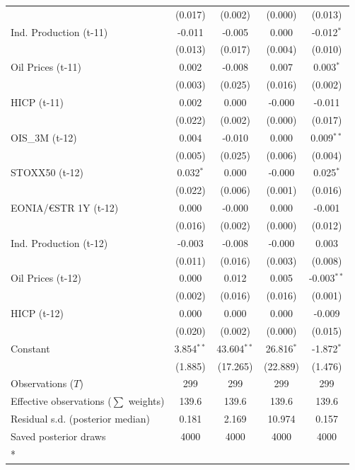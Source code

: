 \begin{longtable}[t]{lcccc}
 & (0.017) & (0.002) & (0.000) & (0.013)\\
Ind. Production (t-11) & -0.011 & -0.005 & 0.000 & -0.012$^{*}$\\
 & (0.013) & (0.017) & (0.004) & (0.010)\\
Oil Prices (t-11) & 0.002 & -0.008 & 0.007 & 0.003$^{*}$\\
 & (0.003) & (0.025) & (0.016) & (0.002)\\
HICP (t-11) & 0.002 & 0.000 & -0.000 & -0.011\\
 & (0.022) & (0.002) & (0.000) & (0.017)\\
OIS\_3M (t-12) & 0.004 & -0.010 & 0.000 & 0.009$^{**}$\\
 & (0.005) & (0.025) & (0.006) & (0.004)\\
STOXX50 (t-12) & 0.032$^{*}$ & 0.000 & -0.000 & 0.025$^{*}$\\
 & (0.022) & (0.006) & (0.001) & (0.016)\\
EONIA/€STR 1Y (t-12) & 0.000 & -0.000 & 0.000 & -0.001\\
 & (0.016) & (0.002) & (0.000) & (0.012)\\
Ind. Production (t-12) & -0.003 & -0.008 & -0.000 & 0.003\\
 & (0.011) & (0.016) & (0.003) & (0.008)\\
Oil Prices (t-12) & 0.000 & 0.012 & 0.005 & -0.003$^{**}$\\
 & (0.002) & (0.016) & (0.016) & (0.001)\\
HICP (t-12) & 0.000 & 0.000 & 0.000 & -0.009\\
 & (0.020) & (0.002) & (0.000) & (0.015)\\
Constant & 3.854$^{**}$ & 43.604$^{**}$ & 26.816$^{*}$ & -1.872$^{*}$\\
 & (1.885) & (17.265) & (22.889) & (1.476)\\
\midrule
Observations ($T$) & 299 & 299 & 299 & 299\\
Effective observations ($\sum$ weights) & 139.6 & 139.6 & 139.6 & 139.6\\
Residual s.d. (posterior median) & 0.181 & 2.169 & 10.974 & 0.157\\
Saved posterior draws & 4000 & 4000 & 4000 & 4000\\*
\end{longtable}
\endgroup{}

\begingroup\fontsize{7}{9}\selectfont

